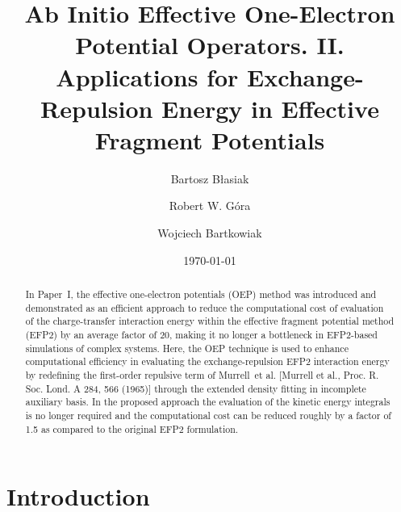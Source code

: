 \documentclass[aip,jcp,amsmath,amssymb,preprint,floatfix]{revtex4-1}
\begin{document}
\title{Ab Initio Effective One-Electron Potential Operators. II.
Applications for Exchange-Repulsion Energy in Effective Fragment Potentials}

\author{Bartosz B{\l}asiak}

\author{Robert W. G{\'o}ra}
\author{Wojciech Bartkowiak}


\date{\today}

\begin{abstract}
In Paper~I, the effective one\hyp{}electron
potentials (OEP) method was introduced and demonstrated as an
efficient approach
to reduce the computational cost
of evaluation of the charge-transfer interaction energy
within the effective fragment potential method (EFP2)
by an average factor of 20, making it no longer a bottleneck
in EFP2\hyp{}based simulations of complex systems.
Here, the OEP technique 
is used to enhance computational efficiency in evaluating the
exchange\hyp{}repulsion EFP2 interaction energy
by redefining the first\hyp{}order repulsive term of 
Murrell~et al. [Murrell et al., Proc. R. Soc. Lond. A 284, 566 (1965)] through
the extended density fitting in incomplete auxiliary basis.
In the proposed approach the evaluation of the kinetic energy integrals is no
longer required and the computational cost can be reduced roughly by a factor
of 1.5 as compared to the original EFP2 formulation.
\end{abstract}

\pacs{}

\maketitle


\section{\label{s:1.introduction}Introduction}
\end{document}
